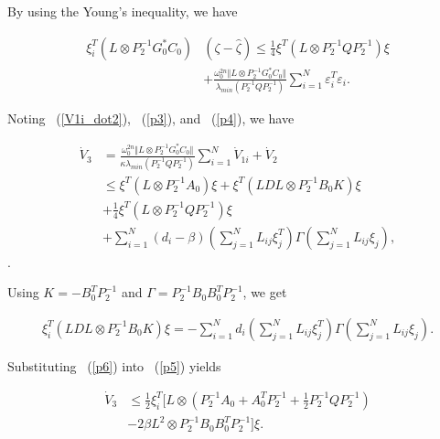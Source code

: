 \documentclass[english]{cccconf}
\begin{document}
By using the Young's inequality\cite{Matrix}, we have

\begin{equation}
  \label{p4}
  \begin{aligned}
\xi^T_i ( L \otimes P^{-1}_{2} G_{0}^{*} C_0) &(\zeta - \hat \zeta) \le \frac{1}{4} \xi^T (L \otimes P_{2}^{-1} Q P_{2}^{-1}) \xi \\ &+ \frac{\omega^{2n}_0 \Vert L \otimes P^{-1}_{2}G_{0}^{*}C_0 \Vert}{ \lambda_{min}(P_{2}^{-1} Q P_{2}^{-1})} \sum_{i=1}^{N}\varepsilon_i^T \varepsilon_i.
  \end{aligned}
\end{equation}

Noting ~(\ref{V1i_dot2}), ~(\ref{p3}), and ~(\ref{p4}),  we have

\begin{equation}
  \label{p5}
  \begin{aligned}
\dot V_3 &= \frac{\omega^{2n}_0 \Vert L \otimes P^{-1}_{2}G_{0}^{*}C_0 \Vert}{\kappa \lambda_{min}{(P_2^{-1} Q P_2^{-1})}} \sum_{i=1}^N \dot V_{1i} + \dot V_2 \\
& \le \xi^T ( L \otimes P^{-1}_{2} A_{0}) \xi + \xi^T ( LDL \otimes P^{-1}_{2} B_{0} K) \xi \\
&+\frac{1}{4} \xi^T (L \otimes P_{2}^{-1} Q P_{2}^{-1}) \xi \\
&+\sum_{i=1}^N(d_i-\beta)(\sum_{j=1}^N L_{i j} \xi_{j}^T)\Gamma(\sum_{j=1}^N L_{i j} \xi_{j}), 
  \end{aligned}
\end{equation}.

Using $K=-B_0^T P_2^{-1}$ and $\Gamma = P_2^{-1}B_0 B_0^T P_2^{-1}$, we get

\begin{equation}
  \label{p6}
  \begin{aligned}
  \xi^T_i ( LDL \otimes P^{-1}_{2} B_{0} K) \xi=-\sum_{i=1}^{N}d_i(\sum_{j=1}^N L_{ij} \xi_{j}^T)\Gamma(\sum_{j=1}^N L_{ij} \xi_{j}).  
  \end{aligned}
\end{equation}

Substituting ~(\ref{p6}) into ~(\ref{p5}) yields

\begin{equation}
  \label{p7}
  \begin{aligned}
\dot V_3
&\le \frac{1}{2} \xi^T_i [ L \otimes \left( P^{-1}_{2} A_{0} + A_{0}^T P^{-1}_{2} + \frac{1}{2}P_{2}^{-1} Q P_{2}^{-1} \right)\\ 
&- 2 \beta L^2 \otimes P_2^{-1}B_{0} B_{0}^{T} P_{2}^{-1} ] \xi. 
  \end{aligned}
\end{equation}
\end{document}
